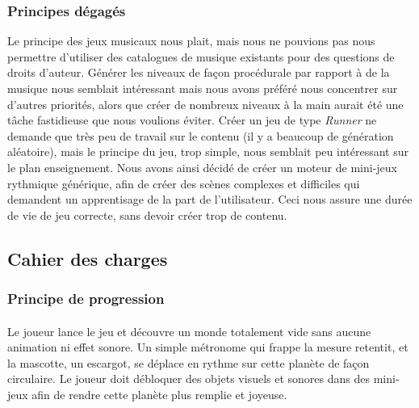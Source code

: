 \subsubsection{Principes dégagés}
Le principe des jeux musicaux nous plait, mais nous ne pouvions pas nous permettre d'utiliser des catalogues de musique existants pour des questions de droits d'auteur. Générer les niveaux de façon procédurale par rapport à de la musique nous semblait intéressant mais nous avons préféré nous concentrer sur d'autres priorités, alors que créer de nombreux niveaux à la main aurait été une tâche fastidieuse que nous voulions éviter. Créer un jeu de type \textit{Runner} ne demande que très peu de travail sur le contenu (il y a beaucoup de génération aléatoire), mais le principe du jeu, trop simple, nous semblait peu intéressant sur le plan enseignement. Nous avons ainsi décidé de créer un moteur de mini-jeux rythmique générique, afin de créer des scènes complexes et difficiles qui demandent un apprentisage de la part de l'utilisateur. Ceci nous assure une durée de vie de jeu correcte, sans devoir créer trop de contenu.


\subsection{Cahier des charges}

\subsubsection{Principe de progression}
\paragraph{} Le joueur lance le jeu et découvre un monde totalement vide sans aucune animation ni effet sonore. Un simple métronome qui frappe la mesure retentit, et la mascotte, un escargot, se déplace en rythme sur cette planète de façon circulaire.
Le joueur doit débloquer des objets visuels et sonores dans des mini-jeux afin de rendre cette planète plus remplie et joyeuse.

